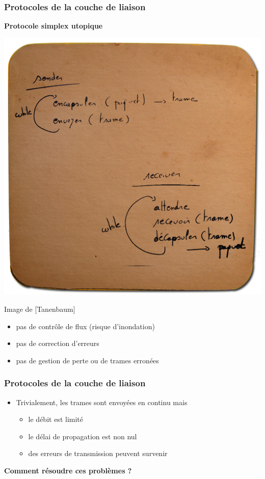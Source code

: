 \begin{frame}[fragile]
  \frametitle{Protocoles de la couche de liaison}
{\large\bf Protocole simplex utopique}
\begin{center}
	\includegraphics[width=.4\linewidth]{img/sousbock-protocole-1.png}
	\par{\scriptsize Image de [Tanenbaum]} 
\end{center}
\begin{itemize}
	\item pas de contrôle de flux (risque d'inondation)
	\item pas de correction d'erreurs
	\item pas de gestion de perte ou de trames erronées
\end{itemize}
\end{frame}

\begin{frame}[fragile]
  \frametitle{ Protocoles de la couche de liaison}
\begin{itemize}
	\item Trivialement, les trames sont envoyées en continu mais
	\begin{itemize}
		\item le débit est limité
		\item le délai de propagation est non nul
		\item des erreurs de transmission peuvent survenir
	\end{itemize}
\end{itemize}
\begin{center}
	\bf Comment résoudre ces problèmes ?
\end{center}
\end{frame}



